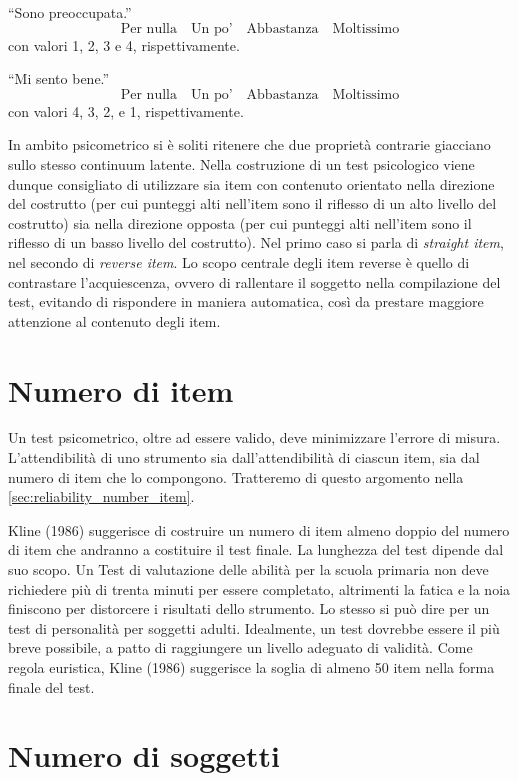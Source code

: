 \noindent ``Sono preoccupata.''
\[
\text{Per nulla} \quad \text{Un po'}\quad \text{Abbastanza} \quad \text{Moltissimo}
\]
con valori 1, 2, 3 e 4, rispettivamente.

\noindent ``Mi sento bene.''
\[
\text{Per nulla} \quad \text{Un po'}\quad \text{Abbastanza} \quad \text{Moltissimo}
\]
con valori 4, 3, 2, e 1, rispettivamente. 

In ambito psicometrico si è soliti ritenere che due proprietà contrarie giacciano sullo stesso continuum latente.  Nella costruzione di un test psicologico viene dunque consigliato di utilizzare sia item con contenuto orientato nella direzione del costrutto (per cui punteggi alti nell'item sono il riflesso di un alto livello del costrutto) sia nella direzione opposta (per cui punteggi alti nell'item sono il riflesso di un basso livello del costrutto). Nel primo caso si parla di \emph{straight item}, nel secondo di \emph{reverse item}. Lo scopo centrale degli item reverse è quello di contrastare l'acquiescenza, ovvero di rallentare il soggetto nella compilazione del test, evitando di rispondere in maniera automatica, così da prestare maggiore attenzione al contenuto degli item.


\section{Numero di item}

Un test psicometrico, oltre ad essere valido, deve minimizzare l'errore di misura. L'attendibilità di uno strumento sia dall'attendibilità di ciascun item, sia dal numero di item che lo compongono. Tratteremo di questo argomento nella \ref{sec:reliability_number_item}.

Kline (1986) suggerisce di costruire un numero di item almeno doppio del numero di item che andranno a costituire il test finale. La lunghezza del test dipende dal suo scopo.  Un  Test di valutazione delle abilità per la scuola primaria non deve richiedere più di trenta minuti per essere completato, altrimenti la fatica e la noia finiscono per distorcere i risultati dello strumento. Lo stesso si può dire per un test di personalità per soggetti adulti.  Idealmente, un test dovrebbe essere il più breve possibile, a patto di raggiungere un livello adeguato di validità. Come regola euristica, Kline (1986) suggerisce la soglia di almeno 50 item nella forma finale del test.

\section{Numero di soggetti}

